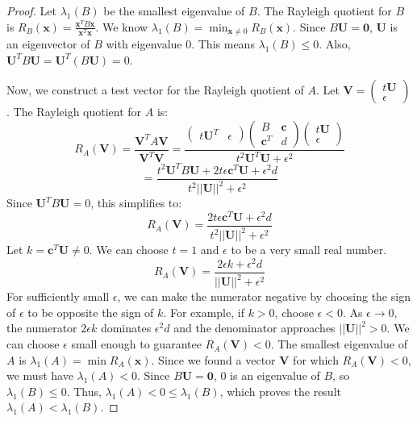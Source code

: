\documentclass[12pt,a4paper]{report}
\theoremstyle{plain}
\theoremstyle{definition}
\theoremstyle{remark}
\begin{document}
\begin{proof}
Let $\lambda_1(B)$ be the smallest eigenvalue of $B$. The Rayleigh quotient for $B$ is $R_B(\bm{x}) = \frac{\bm{x}^T B \bm{x}}{\bm{x}^T \bm{x}}$. We know $\lambda_1(B) = \min_{\bm{x} \ne 0} R_B(\bm{x})$.
Since $B\bm{U} = \bm{0}$, $\bm{U}$ is an eigenvector of $B$ with eigenvalue 0. This means $\lambda_1(B) \le 0$.
Also, $\bm{U}^T B \bm{U} = \bm{U}^T(B\bm{U}) = 0$.

Now, we construct a test vector for the Rayleigh quotient of $A$. Let $\bm{V} = \begin{pmatrix} t\bm{U} \\ \epsilon \end{pmatrix}$.
The Rayleigh quotient for $A$ is:
$$ R_A(\bm{V}) = \frac{\bm{V}^T A \bm{V}}{\bm{V}^T \bm{V}} = \frac{\begin{pmatrix} t\bm{U}^T & \epsilon \end{pmatrix} \begin{pmatrix} B & \bm{c} \\ \bm{c}^T & d \end{pmatrix} \begin{pmatrix} t\bm{U} \\ \epsilon \end{pmatrix}}{t^2\bm{U}^T \bm{U} + \epsilon^2} $$
$$ = \frac{t^2\bm{U}^T B \bm{U} + 2t\epsilon \bm{c}^T \bm{U} + \epsilon^2 d}{t^2||\bm{U}||^2 + \epsilon^2} $$
Since $\bm{U}^T B \bm{U} = 0$, this simplifies to:
$$ R_A(\bm{V}) = \frac{2t\epsilon \bm{c}^T \bm{U} + \epsilon^2 d}{t^2||\bm{U}||^2 + \epsilon^2} $$
Let $k = \bm{c}^T \bm{U} \ne 0$. We can choose $t=1$ and $\epsilon$ to be a very small real number.
$$ R_A(\bm{V}) = \frac{2\epsilon k + \epsilon^2 d}{||\bm{U}||^2 + \epsilon^2} $$
For sufficiently small $\epsilon$, we can make the numerator negative by choosing the sign of $\epsilon$ to be opposite the sign of $k$. For example, if $k > 0$, choose $\epsilon < 0$.
As $\epsilon \to 0$, the numerator $2\epsilon k$ dominates $\epsilon^2 d$ and the denominator approaches $||\bm{U}||^2 > 0$.
We can choose $\epsilon$ small enough to guarantee $R_A(\bm{V}) < 0$.
The smallest eigenvalue of $A$ is $\lambda_1(A) = \min R_A(\bm{x})$. Since we found a vector $\bm{V}$ for which $R_A(\bm{V}) < 0$, we must have $\lambda_1(A) < 0$.
Since $B\bm{U}=\bm{0}$, $0$ is an eigenvalue of $B$, so $\lambda_1(B) \le 0$.
Thus, $\lambda_1(A) < 0 \le \lambda_1(B)$, which proves the result $\lambda_1(A) < \lambda_1(B)$.
\end{proof}
\end{document}

